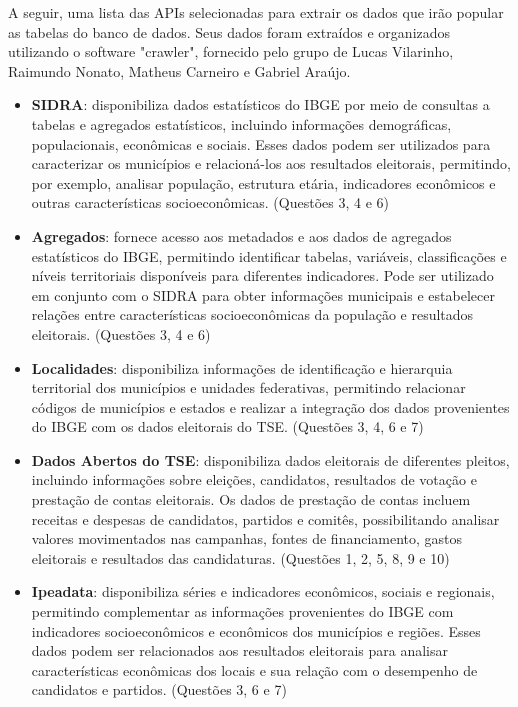 A seguir, uma lista das APIs selecionadas para extrair os dados que irão popular as tabelas do banco de dados. Seus dados
foram extraídos e organizados utilizando o software "crawler", fornecido pelo grupo de Lucas Vilarinho,
Raimundo Nonato,
Matheus Carneiro e
Gabriel Araújo.

\begin{itemize}

    \item \textbf{SIDRA}: disponibiliza dados estatísticos do IBGE por meio de consultas a tabelas e agregados estatísticos, incluindo informações demográficas, populacionais, econômicas e sociais. Esses dados podem ser utilizados para caracterizar os municípios e relacioná-los aos resultados eleitorais, permitindo, por exemplo, analisar população, estrutura etária, indicadores econômicos e outras características socioeconômicas. (Questões 3, 4 e 6)

    \item \textbf{Agregados}: fornece acesso aos metadados e aos dados de agregados estatísticos do IBGE, permitindo identificar tabelas, variáveis, classificações e níveis territoriais disponíveis para diferentes indicadores. Pode ser utilizado em conjunto com o SIDRA para obter informações municipais e estabelecer relações entre características socioeconômicas da população e resultados eleitorais. (Questões 3, 4 e 6)

    \item \textbf{Localidades}: disponibiliza informações de identificação e hierarquia territorial dos municípios e unidades federativas, permitindo relacionar códigos de municípios e estados e realizar a integração dos dados provenientes do IBGE com os dados eleitorais do TSE. (Questões 3, 4, 6 e 7)

    \item \textbf{Dados Abertos do TSE}: disponibiliza dados eleitorais de diferentes pleitos, incluindo informações sobre eleições, candidatos, resultados de votação e prestação de contas eleitorais. Os dados de prestação de contas incluem receitas e despesas de candidatos, partidos e comitês, possibilitando analisar valores movimentados nas campanhas, fontes de financiamento, gastos eleitorais e resultados das candidaturas. (Questões 1, 2, 5, 8, 9 e 10) 

    \item \textbf{Ipeadata}: disponibiliza séries e indicadores econômicos, sociais e regionais, permitindo complementar as informações provenientes do IBGE com indicadores socioeconômicos e econômicos dos municípios e regiões. Esses dados podem ser relacionados aos resultados eleitorais para analisar características econômicas dos locais e sua relação com o desempenho de candidatos e partidos. (Questões 3, 6 e 7)


\end{itemize}
